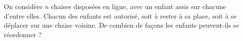 On considère $n$ chaises disposées en ligne, avec un enfant assis sur chacune d'entre elles. Chacun des enfants est autorisé, soit à rester à sa place, soit à se déplacer sur une chaise voisine. De combien de façons les enfants peuvent-ils se réordonner ?

